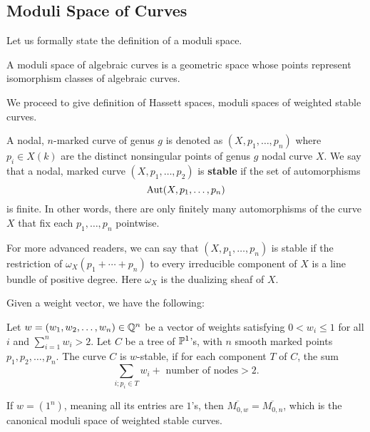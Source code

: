 \subsection{Moduli Space of Curves}
\label{sec:moduli-space-of-curves}
    Let us formally state the definition of a moduli space. 
    \begin{definition}
        A moduli space of algebraic curves is a geometric space 
        whose points represent isomorphism classes of algebraic curves.
    \end{definition}
    
    We proceed to give definition of Hassett spaces, moduli spaces of weighted stable curves.
    \begin{definition}
    \label{def:nodal-stable-curve}
    	A nodal, $n$-marked curve of genus $g$ is denoted as 
	    $(X, p_1, \ldots, p_n)$ 
	    where $p_i \in X(k)$ are the distinct nonsingular points of genus $g$
	    nodal curve $X$.
	    We say that a nodal, marked curve $(X, p_1, \ldots, p_2)$ 
	    is \textbf{stable} if the set of automorphisms 
	    \[
	    \aut(X, p_1, \ldots, p_n)
	    \]
	    is finite.
	    In other words, 
	    there are only finitely many automorphisms of the curve $X$ 
	    that fix each $p_1, \ldots, p_n$ pointwise. 
    \end{definition}
    
    For more advanced readers, 
    we can say that $(X, p_1, \ldots, p_n)$ is stable 
    if the restriction of $\omega_X(p_1 + \cdots + p_n)$ 
    to every irreducible component of $X$ is a line bundle of positive degree.
    Here $\omega_X$ is the dualizing sheaf of $X$.
    
    Given a weight vector, we have the following:
    \begin{definition}
    \label{def:tropical-w-stable-curve}
        Let $w = (w_1, w_2, \ldots, w_n) \in \Q^n$ 
        be a vector of weights satisfying $0 < w_i \le 1$ for all $i$ 
        and $\sum\limits_{i = 1}^{n} w_i > 2$.
        Let $C$ be a tree of $\P^1$'s, with $n$ smooth marked points 
        $p_1, p_2, \ldots, p_n$. 
        The curve $C$ is $w$-stable, if for each component $T$ of $C$,
        the sum 
        \[
        \sum\limits_{i;p_i \in T} w_i + \text{ number of nodes} > 2.
        \]
    \end{definition}
    If $w = (1^n)$, meaning all its entries are $1$'s,
    then $\overline{M_{0, w}} = \overline{M_{0, n}}$,
    which is the canonical moduli space of weighted stable curves. 
    
